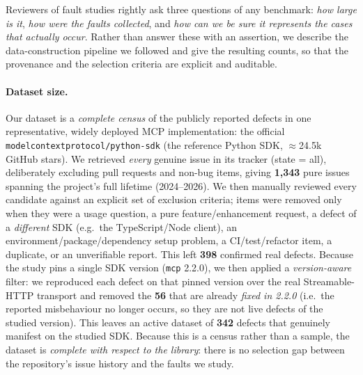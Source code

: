 Reviewers of fault studies rightly ask three questions of any benchmark: \emph{how large is it},
\emph{how were the faults collected}, and \emph{how can we be sure it represents the cases that
actually occur}. Rather than answer these with an assertion, we describe the data-construction
pipeline we followed and give the resulting counts, so that the provenance and the selection
criteria are explicit and auditable.

\paragraph{Dataset size.} Our dataset is a \emph{complete census} of the publicly reported
defects in one representative, widely deployed MCP implementation: the official
\verb|modelcontextprotocol/python-sdk| (the reference Python SDK, $\approx$24.5k GitHub stars).
We retrieved \emph{every} genuine issue in its tracker (state = all), deliberately excluding
pull requests and non-bug items, giving \textbf{1,343} pure issues spanning the project's full
lifetime (2024--2026). We then manually reviewed every candidate against an explicit set of
exclusion criteria; items were removed only when they were a usage question, a
pure feature/enhancement request, a defect of a \emph{different} SDK (e.g.\ the TypeScript/Node
client), an environment/package/dependency setup problem, a CI/test/refactor item, a duplicate,
or an unverifiable report. This left \textbf{398} confirmed real defects. Because the study pins
a single SDK version (\texttt{mcp} 2.2.0), we then applied a \emph{version-aware} filter:
we reproduced each defect on that pinned version over the real Streamable-HTTP transport and
removed the \textbf{56} that are already \emph{fixed in 2.2.0} (i.e.\ the reported misbehaviour
no longer occurs, so they are not live defects of the studied version). This leaves an active
dataset of \textbf{342} defects that genuinely manifest on the studied SDK. Because this is a
census rather than a sample, the dataset is \emph{complete with respect to the library}: there
is no selection gap between the repository's issue history and the faults we study.

